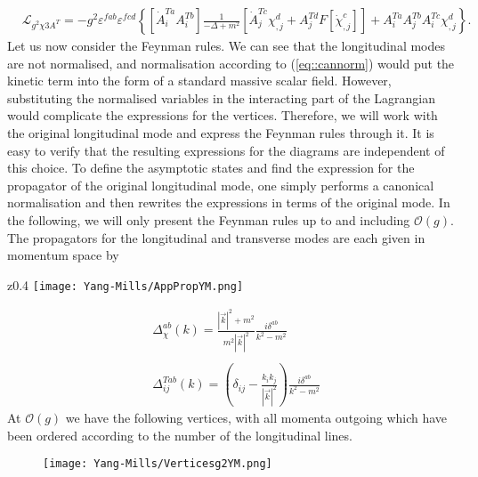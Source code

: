 \documentclass{article}
\begin{document}
\begin{equation*}
    \begin{split}
        &\mathcal{L}_{g^2\chi3A^T}=-g^2\varepsilon^{fab}\varepsilon^{fcd}\left\{\left[\dot{A}_i^{Ta}A_i^{Tb}\right]\frac{1}{-\Delta+m^2}\left[\dot{A}_j^{Tc}\chi_{,j}^d+A_j^{Td}F[\dot{\chi}^c_{,j}]\right]+A_i^{Ta}A_j^{Tb}A_i^{Tc}\chi^d_{,j}\right\}.
    \end{split}
\end{equation*}
Let us now consider the Feynman rules. We can see that the longitudinal modes are not normalised, and normalisation according to (\ref{eq::cannorm}) would put the kinetic term into the form of a standard massive scalar field. However, substituting the normalised variables in the interacting part of the Lagrangian would complicate the expressions for the vertices. Therefore, we will work with the original longitudinal mode and express the Feynman rules through it. It is easy to verify that the resulting expressions for the diagrams are independent of this choice. To define the asymptotic states and find the expression for the propagator of the original longitudinal mode, one simply performs a canonical normalisation and then rewrites the expressions in terms of the original mode. In the following, we will only present the Feynman rules up to and including $\mathcal{O}(g)$.
The propagators for the longitudinal and transverse modes are each given in momentum space by \newline 
\vspace{-5mm}
\begin{wrapfigure}[3]{z}{0.4\textwidth}
    \centering
    \texttt{[image: Yang-Mills/AppPropYM.png]}
\end{wrapfigure}
\begin{equation*}
    \begin{split}
        &\Delta_{\chi}^{ab}(k)=\frac{|\vec{k}|^2+m^2}{m^2|\vec{k}|^2}\frac{i\delta^{ab}}{k^2-m^2}\\\\
        &\Delta_{ij}^{Tab}(k)=\left(\delta_{ij}-\frac{k_ik_j}{|\vec{k}|^2}\right)\frac{i\delta^{ab}}{k^2-m^2}
    \end{split}
\end{equation*}
At $\mathcal{O}(g)$ we have the following vertices, with all momenta outgoing which have been ordered according to the number of the longitudinal lines. 
\begin{figure}[h]
\texttt{[image: Yang-Mills/Verticesg2YM.png]}
\centering
\end{figure}
\end{document}
